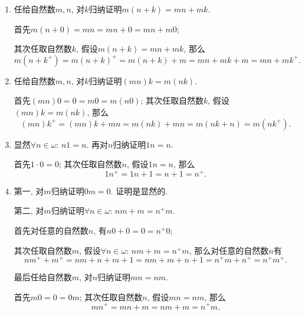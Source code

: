 \begin{enumerate}
    \item 任给自然数$m,n$, 对$k$归纳证明$m(n+k)=mn+mk$.
    
    \hspace{2.17em}
    首先$m(n+0)=mn=mn+0=mn+m0$;
    
    \hspace{2.17em}
    其次任取自然数$k$, 假设$m(n+k)=mn+mk$, 那么
    \[
        m(n+k^+)=m(n+k)^+=m(n+k)+m=mn+mk+m=mn+mk^+.
    \]

    \item 任给自然数$m,n$, 对$k$归纳证明$(mn)k=m(nk)$.
    
    \hspace{2.17em}
    首先$(mn)0=0=m0=m(n0)$; 其次任取自然数$k$, 假设$(mn)k=m(nk)$, 那么
    \[
        (mn)k^+=(mn)k+mn=m(nk)+mn=m(nk+n)=m(nk^+).
    \]

    \item 显然$\forall n\in\omega:\,n1=n$. 再对$n$归纳证明$1n=n$.
    
    \hspace{2.17em}
    首先$1\cdot 0=0$; 其次任取自然数$n$, 假设$1n=n$, 那么
    \[
        1n^+=1n+1=n+1=n^+.
    \]

    \item 第一, 对$m$归纳证明$0m=0$. 证明是显然的.    
    
    \hspace{2.17em}
    第二, 对$m$归纳证明$\forall n\in\omega:\,nm+m=n^+m$.
    
    \hspace{2.17em}
    首先对任意的自然数$n$, 有$n0+0=0=n^+0$;
    
    \hspace{2.17em}
    其次任取自然数$m$,
    假设$\forall n\in\omega:\,nm+m=n^+m$, 那么对任意的自然数$n$有
    \[
        nm^++m^+=nm+n+m+1=nm+m+n+1=n^+m+n^+=n^+m^+.
    \]

    \hspace{2.17em}
    最后任给自然数$m$, 对$n$归纳证明$mn=nm$.
    
    \hspace{2.17em}
    首先$m0=0=0m$; 其次任取自然数$n$, 假设$mn=nm$, 那么
    \begin{equation*}
        mn^+=mn+m=nm+m=n^+m.
    \tag*{\qedsymbol}\end{equation*}
\end{enumerate}





